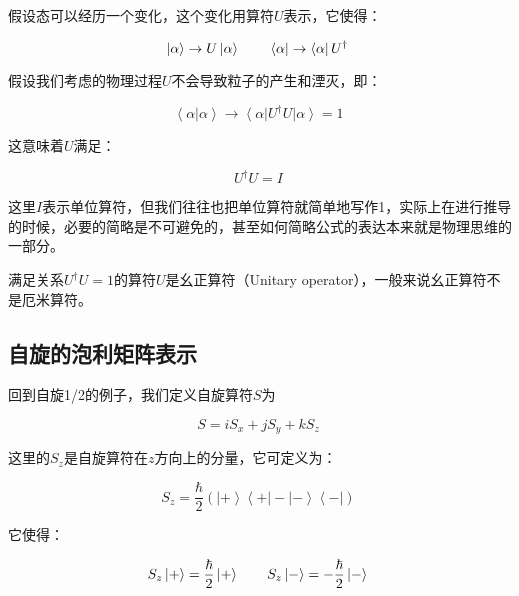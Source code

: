 假设态可以经历一个变化，这个变化用算符$U$表示，它使得：

\begin{equation}
\left| \alpha \right\rangle  \to  U \left| \alpha \right\rangle \\ \qquad
\left\langle \alpha \right|  \to  \left\langle \alpha \right| U^\dagger~
\end{equation}

假设我们考虑的物理过程$U$不会导致粒子的产生和湮灭，即：

\begin{equation}
\left\langle \alpha | \alpha \right\rangle \to  \left\langle \alpha \right| U^\dagger U \left| \alpha \right\rangle = 1~
\end{equation}

这意味着$U$满足：

\begin{equation}
U^\dagger U = I~
\end{equation}

这里$I$表示单位算符，但我们往往也把单位算符就简单地写作1，实际上在进行推导的时候，必要的简略是不可避免的，甚至如何简略公式的表达本来就是物理思维的一部分。

满足关系$U^\dagger U = 1$的算符$U$是幺正算符（Unitary operator），一般来说幺正算符不是厄米算符。


\subsection{自旋的泡利矩阵表示}

回到自旋1/2的例子，我们定义自旋算符$S$为

\begin{equation}
S = i S_x + j S_y + k S_z~
\end{equation}

这里的$S_z$是自旋算符在$z$方向上的分量，它可定义为：

\begin{equation}
S_z = \frac{\hbar}{2} \left( \left| + \right\rangle \left\langle + \right| - \left| - \right\rangle \left\langle - \right|  \right)~
\end{equation}

它使得：

\begin{equation}
S_z \left| + \right\rangle = \frac{\hbar}{2} \left| + \right\rangle \\ \qquad
S_z \left| - \right\rangle = - \frac{\hbar}{2} \left| - \right\rangle~
\end{equation}

